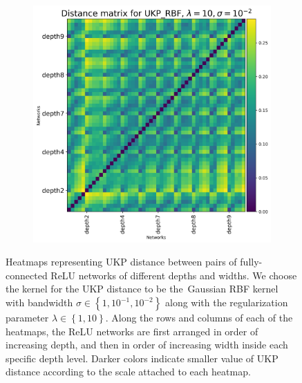 \documentclass{article}
\theoremstyle{plain}
\newcommand{\metricstname}{UKP }
\begin{document}
\begin{figure}[!h]
\begin{subfigure}[b]{0.3\textwidth}
    \end{subfigure}
    \hfill
    \begin{subfigure}[b]{0.3\textwidth}
        \includegraphics[width=\textwidth]{Appendix figures/mnist_experiments/Heatmaps/Heatmap for UKP_dist_RBF_1.000000e+01_1.000000e-02.png}
    \end{subfigure}
    
    \caption{Heatmaps representing \metricstname distance between pairs of fully-connected ReLU networks of different depths and widths. We choose the kernel for the \metricstname distance to be the Gaussian RBF kernel with bandwidth $\sigma \in \left\{1,10^{-1},10^{-2}\right\}$ along with the regularization parameter $\lambda \in \left\{1,10\right\}$. Along the rows and columns of each of the heatmaps, the ReLU networks are first arranged in order of increasing depth, and then in order of increasing width inside each specific depth level. Darker colors indicate smaller value of \metricstname distance according to the scale attached to each heatmap.}
    \label{MNIST Heatmaps}
\end{figure}
\end{document}
